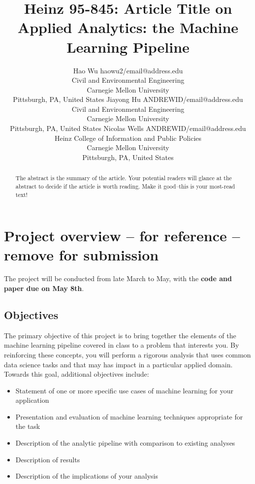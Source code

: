 \documentclass[twoside,11pt]{article}
\begin{document}
\title{Heinz 95-845: Article Title on \\ Applied Analytics: the Machine Learning Pipeline}

\author{\name Hao Wu \email haowu2/email@address.edu \\
       \addr Civil and Environmental Engineering\\
       Carnegie Mellon University\\
       Pittsburgh, PA, United States
       \AND
       \name Jiayong Hu \email ANDREWID/email@address.edu \\
       \addr Civil and Environmental Engineering\\
        Carnegie Mellon University \\
        Pittsburgh, PA, United States
        \AND
       \name Nicolas Wells \email ANDREWID/email@address.edu \\
       \addr Heinz College of Information and Public Policies\\
        Carnegie Mellon University \\
        Pittsburgh, PA, United States
        } 

\maketitle

\begin{abstract}
  The abstract is the summary of the article. Your potential readers will glance at the abstract to decide
  if the article is worth reading. Make it good--this is your most-read text!  
\end{abstract}

\section{Project overview -- for reference -- remove for submission}

The project will be conducted from late March to May, with the \textbf{code and paper due on May 8th}.

\subsection{Objectives}
The primary objective of this project is to bring together the elements of the machine learning pipeline covered in class to a problem that interests you. By reinforcing these concepts, you will perform a rigorous analysis that uses common data science tasks and that may has impact in a particular applied domain. Towards this goal, additional objectives include:
\begin{itemize} 
\item Statement of one or more specific use cases of machine learning for your application
\item Presentation and evaluation of machine learning techniques appropriate for the task
\item Description of the analytic pipeline with comparison to existing analyses
\item Description of results
\item Description of the implications of your analysis
\end{itemize}
\end{document}
